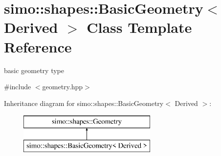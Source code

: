 \hypertarget{classsimo_1_1shapes_1_1_basic_geometry}{\section{simo\-:\-:shapes\-:\-:Basic\-Geometry$<$ Derived $>$ Class Template Reference}
\label{classsimo_1_1shapes_1_1_basic_geometry}
}


basic geometry type  




{\ttfamily \#include $<$geometry.\-hpp$>$}

Inheritance diagram for simo\-:\-:shapes\-:\-:Basic\-Geometry$<$ Derived $>$\-:\begin{figure}[H]
\begin{center}
\leavevmode
\includegraphics[height=2.000000cm]{classsimo_1_1shapes_1_1_basic_geometry}
\end{center}
\end{figure}
